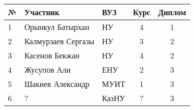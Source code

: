 \begin{center}
\begin{tabular}{|l|l|l|c|c|}
\hline
№ & Участник & ВУЗ & Курс & Диплом \\
\hline
1 & Орынкул Батырхан & НУ & 4 & 1  \\
\hline
2 & Калмурзаев Сергазы & НУ & 3 & 2  \\
\hline
3 & Касенов Бекжан & НУ & 4 & 2  \\
\hline
4 & Жусупов Али & ЕНУ & 2 & 3  \\
\hline
5 & Шакиев Александр & МУИТ & 1 & 3  \\
\hline
6 & ? & КазНУ & ? & 3  \\
\hline
\end{tabular}
\end{center}
